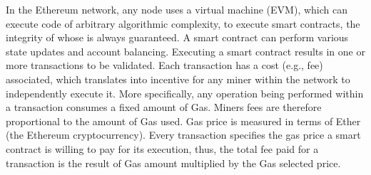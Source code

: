 In the Ethereum network, any node uses a virtual machine (EVM), which can execute code of arbitrary algorithmic complexity, to execute smart contracts, the integrity of whose is always guaranteed. A smart contract can perform various state updates and account balancing.  
Executing a smart contract results in one or more transactions to be validated. Each transaction has a cost (e.g., fee) associated, which translates into incentive for any miner within the network to independently execute it. 
More specifically, any operation being performed within a transaction consumes a fixed amount of Gas. Miners fees are therefore proportional to the amount of Gas used. Gas price is measured in terms of Ether (the Ethereum cryptocurrency). Every transaction specifies the gas price a smart contract is willing to pay for its execution, thus, the total fee paid for a transaction is the result of Gas amount multiplied by the Gas selected price.





